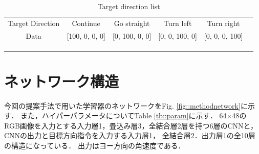  \begin{table}[h]
      \centering
      \caption{Target direction list}
      \begin{tabular}{ccccll}
      \cline{1-5}
      \multicolumn{1}{|c|}{Target Direction} & \multicolumn{1}{c|}{Continue}&\multicolumn{1}{c|}{Go straight}          & \multicolumn{1}{c|}{Turn left}          & \multicolumn{1}{c|}{Turn right}          &  \\ \cline{1-5}
      \multicolumn{1}{|c|}{Data}  &\multicolumn{1}{c|}{{[}100, 0, 0, 0{]}}& \multicolumn{1}{c|}{{[}0, 100, 0, 0{]}} & \multicolumn{1}{c|}{{[}0, 0, 100, 0{]}} & \multicolumn{1}{l|}{{[}0, 0, 0, 100{]}} &  \\ \cline{1-5}
                                 &                                  &                                  &                                  &  \\
                                 &                                  &                                  &                                  &  \\
      \multicolumn{1}{l}{}       &                                  &                                  &                                  & 
      \end{tabular}
      \vspace{-3.0zh}
      \label{tb:command_4}
      \end{table}
\newpage
\section{ネットワーク構造}
\label{net}
今回の提案手法で用いた学習器のネットワークをFig. \ref{fig::methodnetwork}に示す．
また，ハイパーパラメータについてTable \ref{tb::param}に示す．
64×48のRGB画像を入力とする入力層1，畳込み層3，全結合層2層を持つ6層のCNNと，CNNの出力と目標方向指令を入力する入力層1，
全結合層2．出力層1の全10層の構造になっている．
出力はヨー方向の角速度である．

